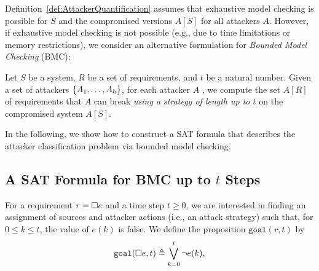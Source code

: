 {%
Definition~\ref{def:AttackerQuantification} assumes that exhaustive model checking is possible for $S$ and the compromised versions $A[S]$ for all attackers $A$. However, if exhaustive model checking is not possible (e.g., due to time limitations or memory restrictions), we consider an alternative formulation for \emph{Bounded Model Checking} (BMC): 
\begin{definition} 
\label{def:BoundedModelCheckingOfSystems}
Let  $S$ be a system, $R$ be a set of requirements, and $t$ be a natural number. Given a set of attackers $\left\{A_1, \ldots , A_h\right\}$, for each attacker $A$ , we compute the set $A[R]$ of requirements that $A$ can break \emph{using a strategy of length up to $t$} on the compromised system $A[S]$. 
\end{definition}

In the following, we show how to construct a SAT formula that describes the attacker classification problem via bounded model checking. 

\subsection{A SAT Formula for BMC up to $t$ Steps}
 For a requirement $r={{\square}} e$ and a time step $t\geq 0$, we are interested in finding an assignment of sources and attacker actions (i.e., an attack strategy) such that, for $0\leq k \leq t$, the value of $e(k)$ is false. We define the proposition $\mathtt{goal}(r,t)$ by
\begin{align}
\mathtt{goal}({{\square}} e,t) \triangleq \bigvee_{k=0}^t{\lnot e(k)}, 
\end{align}
 
}
